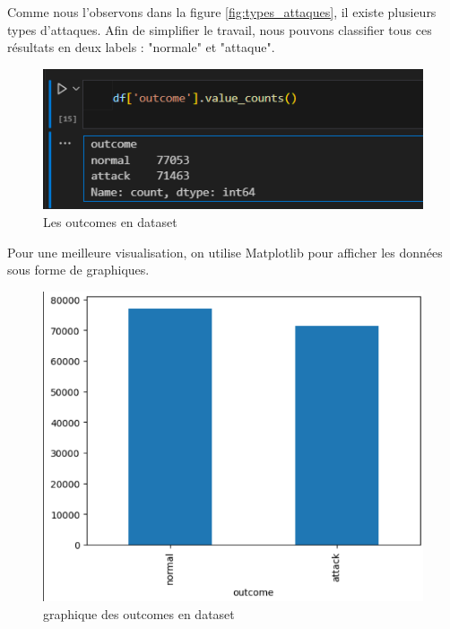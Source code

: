 \documentclass[a4paper,12pt]{report}
\begin{document}
\noindent\normalsize Comme nous l'observons dans la figure \ref{fig:types_attaques}, il existe plusieurs types d'attaques. Afin de simplifier le travail, nous pouvons classifier tous ces résultats en deux labels : "normale" et "attaque".
\begin{figure}[H]
    \centering
    \includegraphics[scale=0.9]{outils-images/data5.png}
    \caption{Les outcomes en dataset}
\end{figure}
\noindent\normalsize Pour une meilleure visualisation, on utilise Matplotlib pour afficher les données sous forme de graphiques.
\begin{figure}[H]
    \centering
    \includegraphics[scale=0.9]{outils-images/graphs/g1.png}
    \caption{graphique des outcomes en dataset}
\end{figure}
\end{document}
